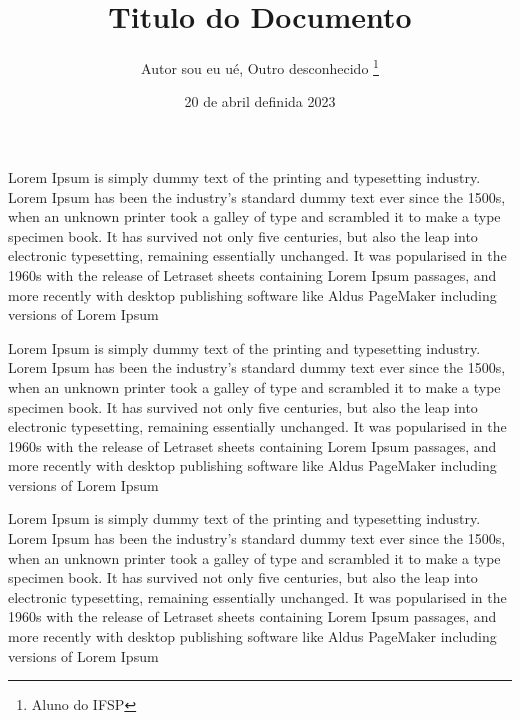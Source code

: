 \documentclass[12pt, a4paper, onside]{article}
\begin{document}
\title{Titulo do Documento}
\author{Autor sou eu ué, Outro desconhecido \footnote{Aluno do IFSP}}  %
\date{20 de abril definida 2023} %
\onehalfspacing
\begin{flushleft}
    Lorem Ipsum is simply dummy text of the printing and typesetting industry. Lorem Ipsum has been the industry's standard dummy text ever since the 1500s, when an unknown printer took a galley of type and scrambled it to make a type specimen book. It has survived not only five centuries, but also the leap into electronic typesetting, remaining essentially unchanged. It was popularised in the 1960s with the release of Letraset sheets containing Lorem Ipsum passages, and more recently with desktop publishing software like Aldus PageMaker including versions of Lorem Ipsum
\end{flushleft}

\begin{flushright}
    Lorem Ipsum is simply dummy text of the printing and typesetting industry. Lorem Ipsum has been the industry's standard dummy text ever since the 1500s, when an unknown printer took a galley of type and scrambled it to make a type specimen book. It has survived not only five centuries, but also the leap into electronic typesetting, remaining essentially unchanged. It was popularised in the 1960s with the release of Letraset sheets containing Lorem Ipsum passages, and more recently with desktop publishing software like Aldus PageMaker including versions of Lorem Ipsum
\end{flushright}

Lorem Ipsum is simply dummy text of the printing and typesetting industry. Lorem Ipsum has been the industry's standard dummy text ever since the 1500s, when an unknown printer took a galley of type and scrambled it to make a type specimen book. It has survived not only five centuries, but also the leap into electronic typesetting, remaining essentially unchanged. It was popularised in the 1960s with the release of Letraset sheets containing Lorem Ipsum passages, and more recently with desktop publishing software like Aldus PageMaker including versions of Lorem Ipsum
\\
\end{document}
